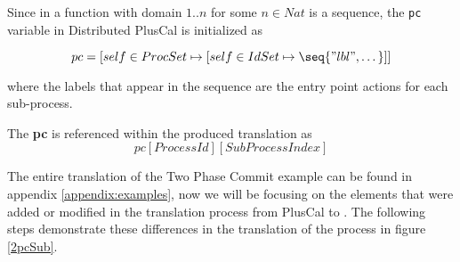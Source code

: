Since in \tlaplus a function with domain $1..n$ for some $n \in Nat$ is a sequence, the \verb|pc| variable in Distributed PlusCal is initialized as

\[
pc = [self \in ProcSet \mapsto [self \in IdSet \mapsto \seq{"lbl",\dots}]]
\]	

where the labels that appear in the sequence are the entry point actions for each sub-process. 

The \textbf{pc} is referenced within the produced \tlaplus translation as \[ pc[Process Id][SubProcess Index] \]
		  
The entire \tlaplus translation of the Two Phase Commit example can be found in appendix \ref{appendix:examples}, now we will be focusing on the elements that were added or modified in the translation process from PlusCal to \tlaplus. The following steps demonstrate these differences in the translation of the process in figure \ref{2pcSub}.


